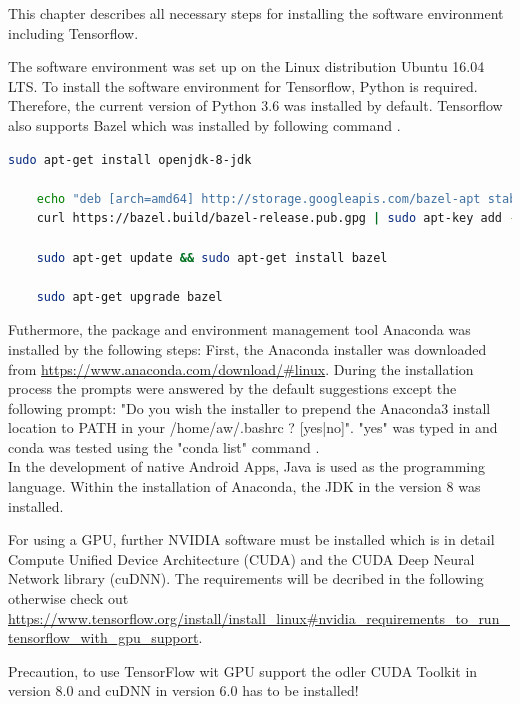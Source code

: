 This chapter describes all necessary steps for installing the software environment including Tensorflow.

The software environment was set up on the Linux distribution Ubuntu 16.04 LTS. To install the software environment for Tensorflow, Python is required. Therefore, the current version of Python 3.6 was installed by default. Tensorflow also supports Bazel which was installed by following command \citep{Bazel}.

\begin{lstlisting}[caption=Bazel Installation, label=list:bazel, language=bash]
	sudo apt-get install openjdk-8-jdk
	
	echo "deb [arch=amd64] http://storage.googleapis.com/bazel-apt stable jdk1.8" | sudo tee /etc/apt/				sources.list.d/bazel.list
	curl https://bazel.build/bazel-release.pub.gpg | sudo apt-key add -
	
	sudo apt-get update && sudo apt-get install bazel
	
	sudo apt-get upgrade bazel
\end{lstlisting}	

Futhermore, the package and environment management tool Anaconda was installed by the following steps:
First, the Anaconda installer was downloaded from \url{https://www.anaconda.com/download/#linux}. During the installation process the prompts were answered by the default suggestions except the following prompt: "Do you wish the installer to prepend the Anaconda3 install location to PATH in your /home/aw/.bashrc ? [yes|no]". "yes" was typed in and conda was tested using the "conda list" command \citep{Anaconda}. \\

In the development of native Android Apps, Java is used as the programming language. Within the installation of Anaconda, the JDK in the version 8 was installed.

For using a GPU, further NVIDIA software must be installed which is in detail Compute Unified Device Architecture (CUDA) and the CUDA Deep Neural Network library (cuDNN). The requirements will be decribed in the following otherwise check out \url{https://www.tensorflow.org/install/install_linux#nvidia_requirements_to_run_tensorflow_with_gpu_support}. 

Precaution, to use TensorFlow wit GPU support the odler CUDA Toolkit in version 8.0 and cuDNN in version 6.0 has to be installed!

